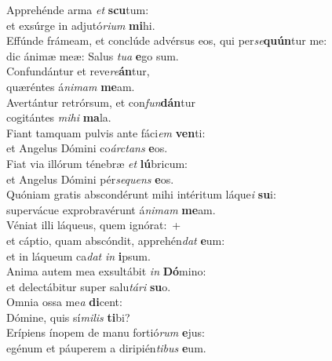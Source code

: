 \evenverse Apprehénde arma \textit{et} \textbf{scu}tum:~\*\\
\evenverse et exsúrge in adjutó\textit{ri}\textit{um} \textbf{mi}hi.\\
\oddverse Effúnde frámeam, et conclúde advérsus eos, qui per\textit{se}\textbf{quún}tur me:~\*\\
\oddverse dic ánimæ meæ: Salus \textit{tu}\textit{a} \textbf{e}go sum.\\
\evenverse Confundántur et reve\textit{re}\textbf{án}tur,~\*\\
\evenverse quæréntes á\textit{ni}\textit{mam} \textbf{me}am.\\
\oddverse Avertántur retrórsum, et con\textit{fun}\textbf{dán}tur~\*\\
\oddverse cogitántes \textit{mi}\textit{hi} \textbf{ma}la.\\
\evenverse Fiant tamquam pulvis ante fáci\textit{em} \textbf{ven}ti:~\*\\
\evenverse et Angelus Dómini co\textit{ár}\textit{ctans} \textbf{e}os.\\
\oddverse Fiat via illórum ténebræ \textit{et} \textbf{lú}bricum:~\*\\
\oddverse et Angelus Dómini pér\textit{se}\textit{quens} \textbf{e}os.\\
\evenverse Quóniam gratis abscondérunt mihi intéritum láque\textit{i} \textbf{su}i:~\*\\
\evenverse supervácue exprobravérunt á\textit{ni}\textit{mam} \textbf{me}am.\\
\oddverse Véniat illi láqueus, quem ignórat:~+\\
\oddverse  et cáptio, quam abscóndit, apprehén\textit{dat} \textbf{e}um:~\*\\
\oddverse et in láqueum ca\textit{dat} \textit{in} \textbf{i}psum.\\
\evenverse Anima autem mea exsultábit \textit{in} \textbf{Dó}mino:~\*\\
\evenverse et delectábitur super salu\textit{tá}\textit{ri} \textbf{su}o.\\
\oddverse Omnia ossa me\textit{a} \textbf{di}cent:~\*\\
\oddverse Dómine, quis sí\textit{mi}\textit{lis} \textbf{ti}bi?\\
\evenverse Erípiens ínopem de manu fortió\textit{rum} \textbf{e}jus:~\*\\
\evenverse egénum et páuperem a diripién\textit{ti}\textit{bus} \textbf{e}um.\\
